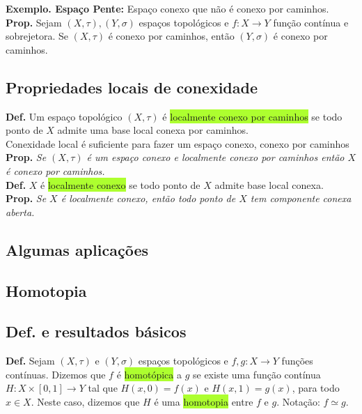 \documentclass{article}
\begin{document}
\begin{landscape}
\begin{multicols}{3}
\textbf{Exemplo. Espaço Pente:} Espaço conexo que não é conexo por caminhos.\\

\textbf{Prop.} Sejam $(X,\tau), (Y,\sigma)$ espaços topológicos e $f : X \to Y$ função contínua e sobrejetora. Se $(X,\tau)$ é conexo por caminhos, então $(Y,\sigma)$ é conexo por caminhos.

\subsection{Propriedades locais de conexidade}
\textbf{Def.} Um espaço topológico $(X, \tau)$ é \colorbox{GreenYellow}{localmente conexo por caminhos} se todo ponto de $X$ admite uma base local conexa por caminhos.\\

 \color{blue!70}Conexidade local é suficiente para fazer um espaço conexo, conexo por caminhos \color{black}\\
 \textbf{Prop.} \textit{Se $(X, \tau)$ é um espaço conexo e localmente conexo por caminhos então $X$ é conexo por caminhos.}\\

 \textbf{Def.} $X$ é \colorbox{GreenYellow}{localmente conexo} se todo ponto de $X$ admite base local conexa.\\

 \textbf{Prop.} \textit{Se $X$ é localmente conexo, então todo ponto de $X$ tem componente conexa aberta.}

 \subsection{Algumas aplicações}
 \end{multicols}
 \begin{center}
     
 \section{Homotopia}
 \end{center}
 \begin{multicols}{3}

  \subsection{Def. e resultados básicos}

 \textbf{Def.} Sejam \( (X, \tau) \) e \( (Y, \sigma) \) espaços topológicos e \( f, g : X \to Y \) funções contínuas. Dizemos que \( f \) é \colorbox{GreenYellow}{homotópica} a \( g \) se existe uma função contínua $H : X \times [0,1] \to Y$ tal que $H(x,0) = f(x)$ e $H(x,1) = g(x)$, para todo $x \in X$.
Neste caso, dizemos que \( H \) é uma \colorbox{GreenYellow}{homotopia} entre \( f \) e \( g \). Notação: \( f \simeq g \).\\


\end{multicols}
\end{landscape}
\end{document}
